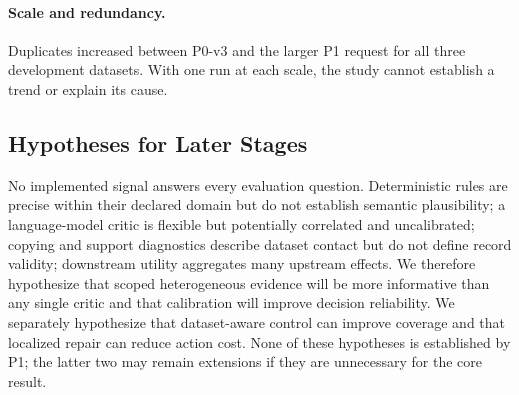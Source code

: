 \paragraph{Scale and redundancy.}

Duplicates increased between P0-v3 and the larger P1 request for all three
development datasets. With one run at each scale, the study cannot establish a
trend or explain its cause.

\subsection{Hypotheses for Later Stages}

No implemented signal answers every evaluation question. Deterministic rules
are precise within their declared domain but do not establish semantic
plausibility; a language-model critic is flexible but potentially correlated
and uncalibrated; copying and support diagnostics describe dataset contact but
do not define record validity; downstream utility aggregates many upstream
effects. We therefore hypothesize that scoped heterogeneous evidence will be
more informative than any single critic and that calibration will improve
decision reliability. We separately hypothesize that dataset-aware control can
improve coverage and that localized repair can reduce action cost. None of
these hypotheses is established by P1; the latter two may remain extensions if
they are unnecessary for the core result.

